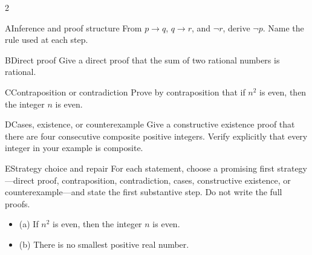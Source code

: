 \documentclass[9pt]{extarticle}
\begin{document}
\begin{multicols}{2}
\begin{CoreProblem}{A}{Inference and proof structure}
From $p\to q$, $q\to r$, and $\neg r$, derive $\neg p$. Name the rule used at
each step.
\end{CoreProblem}
\begin{CoreProblem}{B}{Direct proof}
Give a direct proof that the sum of two rational numbers is rational.
\end{CoreProblem}
\begin{CoreProblem}{C}{Contraposition or contradiction}
Prove by contraposition that if $n^2$ is even, then the integer $n$ is even.
\end{CoreProblem}
\columnbreak
\begin{CoreProblem}{D}{Cases, existence, or counterexample}
Give a constructive existence proof that there are four consecutive composite
positive integers. Verify explicitly that every integer in your example is
composite.
\end{CoreProblem}
\begin{CoreProblem}{E}{Strategy choice and repair}
For each statement, choose a promising first strategy---direct proof,
contraposition, contradiction, cases, constructive existence, or
counterexample---and state the first substantive step. Do not write the full
proofs.
\begin{itemize}
  \item (a) If $n^2$ is even, then the integer $n$ is even.
  \item (b) There is no smallest positive real number.
\end{itemize}
\end{CoreProblem}
\end{multicols}
\CoreWorkArea
\FormBreak
{}
\end{document}
